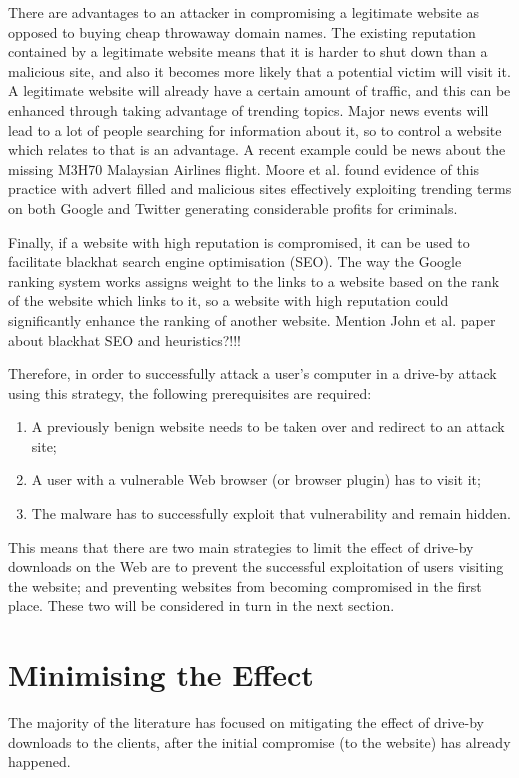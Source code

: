 \documentclass{acm_proc_article-sp}
\begin{document}
There are advantages to an attacker in compromising a legitimate website as opposed to buying cheap throwaway domain names.  The existing reputation contained by a legitimate website means that it is harder to shut down than a malicious site, and also it becomes more likely that a potential victim will visit it.  A legitimate website will already have a certain amount of traffic, and this can be enhanced through taking advantage of trending topics.  Major news events will lead to a lot of people searching for information about it, so to control a website which relates to that is an advantage.  A recent example could be news about the missing M3H70 Malaysian Airlines flight.  Moore et al. found evidence of this practice with advert filled and malicious sites effectively exploiting trending terms on both Google and Twitter generating considerable profits for criminals\cite{fashion}.  

Finally, if a website with high reputation is compromised, it can be used to facilitate blackhat search engine optimisation (SEO).  The way the Google ranking system works assigns weight to the links to a website based on the rank of the website which links to it, so a website with high reputation could significantly enhance the ranking of another website.  Mention John et al. paper about blackhat SEO and heuristics?!!!

Therefore, in order to successfully attack a user's computer in a drive-by attack using this strategy, the following prerequisites are required: 
\begin{enumerate}
	\item A previously benign website needs to be taken over and redirect to an attack site;
	\item A user with a vulnerable Web browser (or browser plugin) has to visit it;
	\item The malware has to successfully exploit that vulnerability and remain hidden.
\end{enumerate}

This means that there are two main strategies to limit the effect of drive-by downloads on the Web are to prevent the successful exploitation of users visiting the website; and preventing websites from becoming compromised in the first place.  These two will be considered in turn in the next section.


\section{Minimising the Effect}
\label{sec:technical}
The majority of the literature has focused on mitigating the effect of drive-by downloads to the clients, after the initial compromise (to the website) has already happened.  
\end{document}
